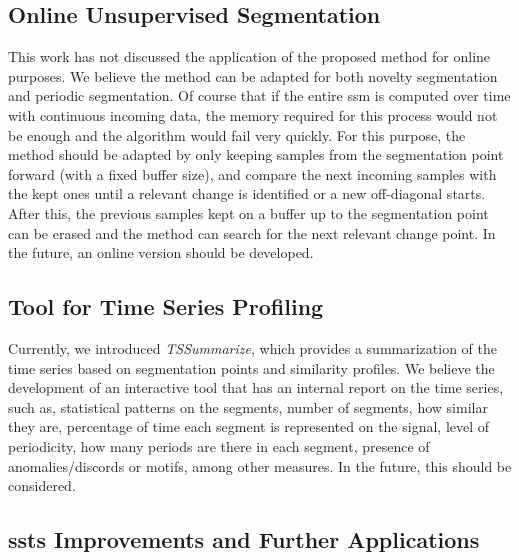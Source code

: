 \subsection{Online Unsupervised Segmentation}

This work has not discussed the application of the proposed method for online purposes. We believe the method can be adapted for both novelty segmentation and periodic segmentation. Of course that if the entire \gls{ssm} is computed over time with continuous incoming data, the memory required for this process would not be enough and the algorithm would fail very quickly. For this purpose, the method should be adapted by only keeping samples from the segmentation point forward (with a fixed buffer size), and compare the next incoming samples with the kept ones until a relevant change is identified or a new off-diagonal starts. After this, the previous samples kept on a buffer up to the segmentation point can be erased and the method can search for the next relevant change point. In the future, an online version should be developed.

\subsection{Tool for Time Series Profiling}

Currently, we introduced \textit{TSSummarize}, which provides a summarization of the time series based on segmentation points and similarity profiles. We believe the development of an interactive tool that has an internal report on the time series, such as, statistical patterns on the segments, number of segments, how similar they are, percentage of time each segment is represented on the signal, level of periodicity, how many periods are there in each segment, presence of anomalies/discords or motifs, among other measures. In the future, this should be considered.

\subsection{\gls{ssts} Improvements and Further Applications}



